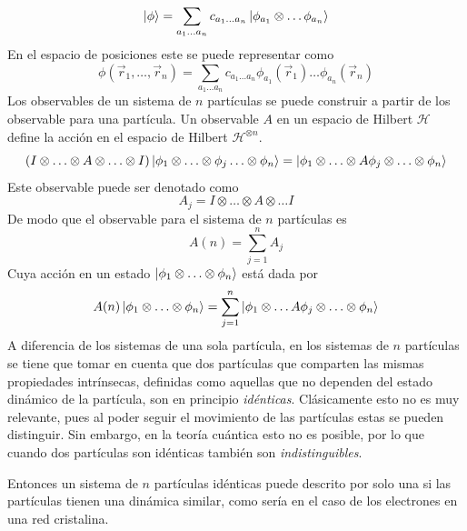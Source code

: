 \begin{equation}
	\ket{\phi} = \sum_{a_1 \ldots a_n}c_{a_1\ldots a_n}\ket{\phi_{a_1}\otimes \ldots \phi_{a_n}}
\end{equation}
En el espacio de posiciones este se puede representar como
\begin{equation}
	\phi(\vec{r}_1, \ldots, \vec{r}_n) = \sum_{a_1\ldots a_n}c_{a_1\ldots a_n}\phi_{a_1}(\vec{r}_1)\ldots\phi_{a_n}(\vec{r}_n)
\end{equation}
Los observables de un sistema de $n$ partículas se puede construir a partir de los observable para una partícula. Un observable $A$ en un espacio de Hilbert $\mathcal{H}$ define la acción en el espacio de Hilbert $\mathcal{H}^{\otimes n}$.
\begin{equation}
	(I \otimes \ldots \otimes A \otimes \ldots \otimes I) \ket{\phi_1\otimes \ldots \otimes \phi_j \ldots\otimes \phi_n} = \ket{\phi_1\otimes \ldots \otimes A\phi_j\otimes \ldots \otimes \phi_n}
\end{equation}
Este observable puede ser denotado como
\begin{equation}
	A_j = I \otimes \ldots \otimes A \otimes \ldots I
\end{equation}
De modo que el observable para el sistema de $n$ partículas es
\begin{equation}
	A(n) = \sum_{j=1}^{n}A_j
\end{equation}
Cuya acción en un estado $\ket{\phi_1\otimes\ldots\otimes\phi_n}$ está dada por
\begin{equation}
	A(n)\ket{\phi_1\otimes\ldots\otimes\phi_n} = \sum_{j=1}^{n}\ket{\phi_1\otimes\ldots A\phi_j \otimes\ldots\otimes\phi_n}
\end{equation}
A diferencia de los sistemas de una sola partícula, en los sistemas de $n$ partículas se tiene que tomar en cuenta que dos partículas que comparten las mismas propiedades intrínsecas, definidas como aquellas que no dependen del estado dinámico de la partícula, son en principio \emph{idénticas}. Clásicamente esto no es muy relevante, pues al poder seguir el movimiento de las partículas estas se pueden distinguir. Sin embargo, en la teoría cuántica esto no es posible, por lo que cuando dos partículas son idénticas también son \emph{indistinguibles}.\par
Entonces un sistema de $n$ partículas idénticas puede descrito por solo una si las partículas tienen una dinámica similar, como sería en el caso de los electrones en una red cristalina.

